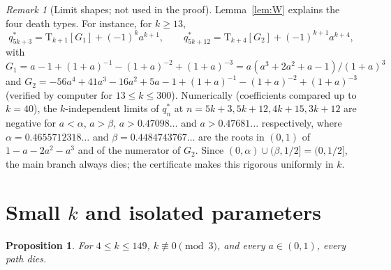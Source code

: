 \documentclass[11pt]{amsart}
\newtheorem{proposition}[theorem]{Proposition}
\theoremstyle{definition}
\theoremstyle{remark}
\newtheorem{remark}[theorem]{Remark}
\newcommand{\Tr}{\mathrm{T}}
\begin{document}
\begin{remark}[Limit shapes; not used in the proof]\label{rem:limit}
Lemma~\ref{lem:W} explains the four death types. For instance, for $k\ge 13$,
\[
q^*_{5k+3}=\Tr_{k+1}[G_1]+(-1)^ka^{k+1},\qquad
q^*_{5k+12}=\Tr_{k+4}[G_2]+(-1)^{k+1}a^{k+4},
\]
with $G_1=a-1+(1+a)^{-1}-(1+a)^{-2}+(1+a)^{-3}=a(a^3+2a^2+a-1)/(1+a)^3$ and
$G_2=-56a^4+41a^3-16a^2+5a-1+(1+a)^{-1}-(1+a)^{-2}+(1+a)^{-3}$
(verified by computer for $13\le k\le 300$). Numerically (coefficients compared up to
$k=40$), the $k$-independent limits of $q^*_n$ at $n=5k+3,5k+12,4k+15,3k+12$ are
negative for $a<\alpha$, $a>\beta$, $a>0.47098\ldots$ and $a>0.47681\ldots$
respectively, where $\alpha=0.4655712318\ldots$ and $\beta=0.4484743767\ldots$
are the roots in $(0,1)$ of $1-a-2a^2-a^3$ and of the numerator of $G_2$. Since
$(0,\alpha)\cup(\beta,1/2]=(0,1/2]$, the main branch always dies; the certificate
makes this rigorous uniformly in $k$.
\end{remark}

\section{Small \texorpdfstring{$k$}{k} and isolated parameters}\label{sec:small}

\begin{proposition}\label{prop:small}
For $4\le k\le 149$, $k\not\equiv 0\pmod 3$, and every $a\in(0,1)$, every path dies.
\end{proposition}
\end{document}
